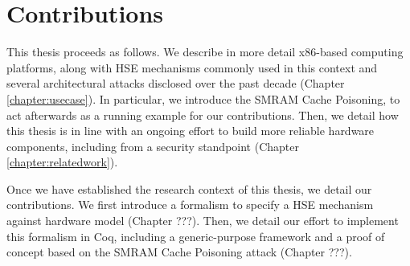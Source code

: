 \section{Contributions}

This thesis proceeds as follows.
%
We describe in more detail x86-based computing platforms, along with HSE
mechanisms commonly used in this context and several architectural attacks
disclosed over the past decade (Chapter\,\ref{chapter:usecase}).
%
In particular, we introduce the SMRAM Cache Poisoning, to act afterwards as a
running example for our contributions.
%
Then, we detail how this thesis is in line with an ongoing effort to build more
reliable hardware components, including from a security standpoint
(Chapter\,\ref{chapter:relatedwork}).

Once we have established the research context of this thesis, we detail our
contributions.
%
We first introduce a formalism to specify a HSE mechanism against hardware model
(Chapter ???).
%
Then, we detail our effort to implement this formalism in Coq, including a
generic-purpose framework and a proof of concept based on the SMRAM Cache
Poisoning attack (Chapter ???).
%
